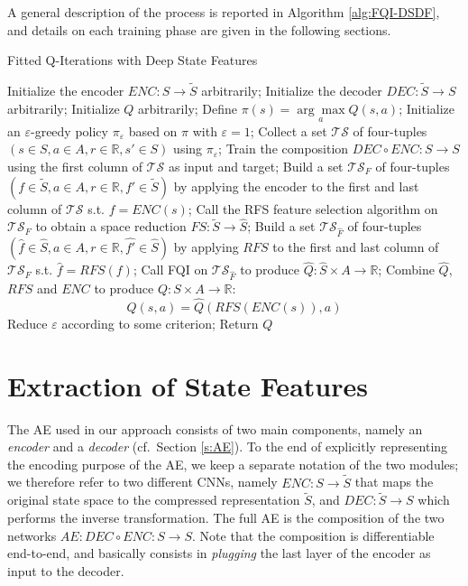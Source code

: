 A general description of the process is reported in Algorithm \ref{alg:FQI-DSDF},
and details on each training phase are given in the following sections. 
%
\begin{algorithm}[h]
    \caption{Fitted Q-Iterations with Deep State Features}
    \label{alg:FQI-DSDF}
    \begin{algorithmic}
	\STATE Initialize the encoder $ENC: S \rightarrow \tilde{S}$ arbitrarily;
	\STATE Initialize the decoder $DEC: \tilde{S} \rightarrow S$ arbitrarily;
	\STATE Initialize $Q$ arbitrarily;
	\STATE Define $\pi(s) = \underset{a}{\arg\max} Q(s, a)$;
	\STATE Initialize an $\varepsilon$-greedy policy $\pi_\varepsilon$ based on $\pi$ with $\varepsilon = 1$;
	\REPEAT 
	    \STATE Collect a set $\mathcal{TS}$ of four-tuples $(s \in S, a \in A, r \in \mathbb{R}, s' \in S)$ using $\pi_\varepsilon$;
	    \STATE Train the composition $DEC \circ ENC: S \rightarrow S$ using the first column of $\mathcal{TS}$ as input and target;
	    \STATE Build a set $\mathcal{TS}_F$ of four-tuples $(f \in \tilde{S}, a \in A, r \in \mathbb{R}, f' \in \tilde{S})$ by applying the encoder to the first and last column of $\mathcal{TS}$ s.t. $f = ENC(s)$;
	    \STATE Call the RFS feature selection algorithm on $\mathcal{TS}_F$ to obtain a space reduction $FS: \tilde{S} \rightarrow \hat{S}$;
	    \STATE Build a set $\mathcal{TS}_{\hat{F}}$ of four-tuples $(\hat{f} \in \hat{S}, a \in A, r \in \mathbb{R}, \hat{f'} \in \hat{S})$ by applying $RFS$ to the first and last column of $\mathcal{TS}_F$ s.t. $\hat{f} = RFS(f)$;
	    \STATE Call FQI on $\mathcal{TS}_{\hat{F}}$ to produce $\hat{Q}: \hat{S} \times A \rightarrow \mathbb{R}$;
	    \STATE Combine $\hat{Q}$, $RFS$ and $ENC$ to produce $Q: S \times A \rightarrow \mathbb{R}$:
		\[
		    Q(s, a) = \hat{Q}(RFS(ENC(s)), a)
		\]
	    \STATE Reduce $\varepsilon$ according to some criterion;
	\STATE Return $Q$
    \end{algorithmic}
\end{algorithm}
%

\section{Extraction of State Features}
The AE used in our approach consists of two main components, namely an 
\textit{encoder} and a \textit{decoder} (cf.\ Section \ref{s:AE}). To the end of 
explicitly representing the encoding purpose of the AE, we keep a separate 
notation of the two modules; we therefore refer to two different CNNs, namely 
$ENC: S \rightarrow \tilde{S}$ that maps the original state space to the 
compressed representation $\tilde{S}$, and $DEC: \tilde{S} \rightarrow S$ which
performs the inverse transformation. The full AE is the composition of the two 
networks $AE: DEC \circ ENC: S \rightarrow S$. Note that the composition is 
differentiable end-to-end, and basically consists in \textit{plugging} the last
layer of the encoder as input to the decoder. 

